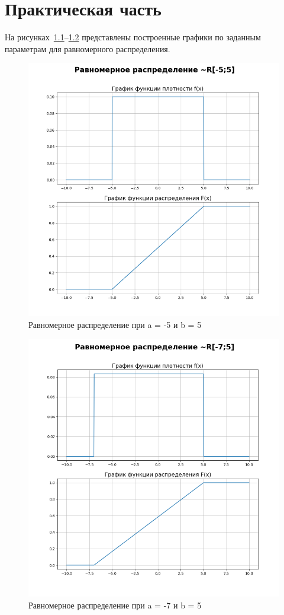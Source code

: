 \chapter{Практическая часть}

На рисунках~\ref{ex:r1}--\ref{ex:r2} представлены построенные графики по заданным параметрам для равномерного распределения.

\begin{figure}[ht!]
	\centering
	\includegraphics[width=0.8\linewidth]{img/r1.png}
	\caption{Равномерное распределение при a = -5 и b = 5}
	\label{ex:r1}
\end{figure}

\clearpage

\begin{figure}[ht!]
	\centering
	\includegraphics[width=0.8\linewidth]{img/r2.png}
	\caption{Равномерное распределение при a = -7 и b = 5}
	\label{ex:r2}
\end{figure}

